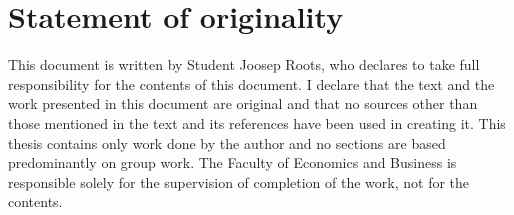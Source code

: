 \chapter*{Statement of originality}

This document is written by Student Joosep Roots, who
declares to take full responsibility for the contents of this document.
I declare that the text and the work presented in this document are original and that no
sources other than those mentioned in the text and its references have been used in
creating it.
This thesis contains only work done by the author and 
no sections are based predominantly on group work.
The Faculty of Economics and Business is responsible solely for the supervision of
completion of the work, not for the contents.